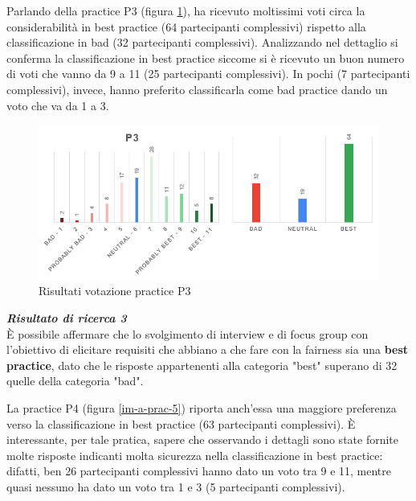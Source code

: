 Parlando della practice P3 (figura \ref{im-a-prac-4}), ha ricevuto moltissimi voti circa la considerabilità in best practice (64 partecipanti complessivi) rispetto alla classificazione in bad (32 partecipanti complessivi). Analizzando nel dettaglio si conferma la classificazione in best practice siccome si è ricevuto un buon numero di voti che vanno da 9 a 11 (25 partecipanti complessivi). In pochi (7 partecipanti complessivi), invece, hanno preferito classificarla come bad practice dando un voto che va da 1 a 3.

\begin{figure}[h!]
    \centering
    \includegraphics[width=1\textwidth]{figure/data-analysis3/P3.png}
    \caption{Risultati votazione practice P3}
    \label{im-a-prac-4}
\end{figure}

\begin{center}
    \begin{tcolorbox}[width=400pt, colframe=black, colback=Gray!30]
		\begin{minipage}{\textwidth}
			\textit{\faKey \textbf{ Risultato di ricerca 3}}\\
			È possibile affermare che lo svolgimento di interview e di focus group con l'obiettivo di elicitare requisiti che abbiano a che fare con la fairness sia una \textbf{best practice}, dato che le risposte appartenenti alla categoria "best" superano di 32 quelle della categoria "bad".
		\end{minipage}
	\end{tcolorbox}
\end{center}

La practice P4 (figura \ref{im-a-prac-5}) riporta anch'essa una maggiore preferenza verso la classificazione in best practice (63 partecipanti complessivi). È interessante, per tale pratica, sapere che osservando i dettagli sono state fornite molte risposte indicanti molta sicurezza nella classificazione in best practice: difatti, ben 26 partecipanti complessivi hanno dato un voto tra 9 e 11, mentre quasi nessuno ha dato un voto tra 1 e 3 (5 partecipanti complessivi).

